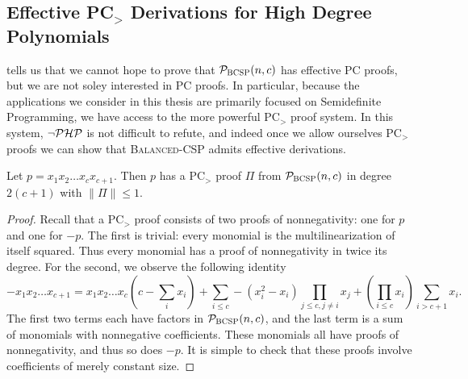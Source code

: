 \subsection{Effective PC$_>$ Derivations for High Degree Polynomials}
 tells us that we cannot hope to prove that $\mathcal P_{\textsc{BCSP}}(n,c)$ has effective PC proofs, but we are not soley interested in PC proofs. In particular, because the applications we consider in this thesis are primarily focused on Semidefinite Programming, we have access to the more powerful PC$_>$ proof system. In this system, $\neg\mathcal P\mathcal H\mathcal P$ is not difficult to refute, and indeed once we allow ourselves PC$_>$ proofs we can show that \textsc{Balanced-CSP} admits effective derivations.
\begin{lemma}\label{lem:highdeg-easy}
Let $p = x_1x_2\dots x_c x_{c+1}$. Then $p$ has a PC$_>$ proof $\Pi$ from $\mathcal P_{\textsc{BCSP}}(n,c)$ in degree $2(c+1)$ with $\|\Pi\| \leq 1$. 
\end{lemma}
\begin{proof}
Recall that a PC$_>$ proof consists of two proofs of nonnegativity: one for $p$ and one for $-p$. The first is trivial: every monomial is the multilinearization of itself squared. Thus every monomial has a proof of nonnegativity in twice its degree. For the second, we observe the following identity
\[-x_1x_2\dots x_{c+1} = x_1x_2\dots x_c\left(c - \sum_i x_i\right) + \sum_{i \leq c} -(x_i^2 - x_i) \prod_{j \leq c, j\neq i} x_j + \left(\prod_{i \leq c} x_i\right) \sum_{i > c+1} x_i. \]
The first two terms each have factors in $\mathcal P_{\textsc{BCSP}}(n,c)$, and the last term is a sum of monomials with nonnegative coefficients. These monomials all have proofs of nonnegativity, and thus so does $-p$. It is simple to check that these proofs involve coefficients of merely constant size. 
\end{proof}

